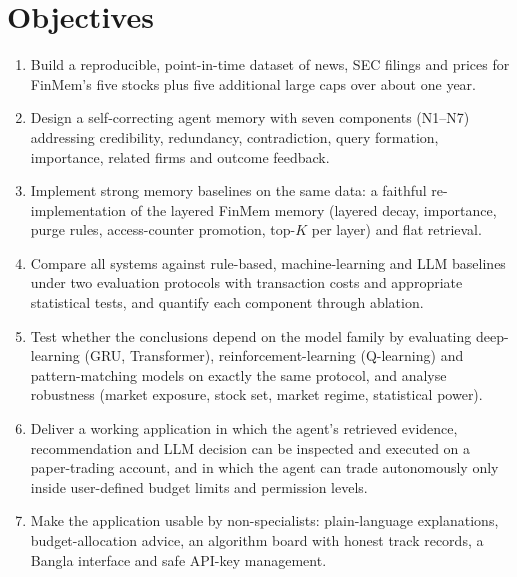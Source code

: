 \section{Objectives}
\begin{enumerate}
  \item Build a reproducible, point-in-time dataset of news, SEC filings and prices for FinMem's five stocks plus five additional large caps over about one year.
  \item Design a self-correcting agent memory with seven components (N1--N7) addressing credibility, redundancy, contradiction, query formation, importance, related firms and outcome feedback.
  \item Implement strong memory baselines on the same data: a faithful re-implementation of the layered FinMem memory (layered decay, importance, purge rules, access-counter promotion, top-$K$ per layer) and flat retrieval.
  \item Compare all systems against rule-based, machine-learning and LLM baselines under two evaluation protocols with transaction costs and appropriate statistical tests, and quantify each component through ablation.
  \item Test whether the conclusions depend on the model family by evaluating deep-learning (GRU, Transformer), reinforcement-learning (Q-learning) and pattern-matching models on exactly the same protocol, and analyse robustness (market exposure, stock set, market regime, statistical power).
  \item Deliver a working application in which the agent's retrieved evidence, recommendation and LLM decision can be inspected and executed on a paper-trading account, and in which the agent can trade autonomously only inside user-defined budget limits and permission levels.
  \item Make the application usable by non-specialists: plain-language explanations, budget-allocation advice, an algorithm board with honest track records, a Bangla interface and safe API-key management.
\end{enumerate}


